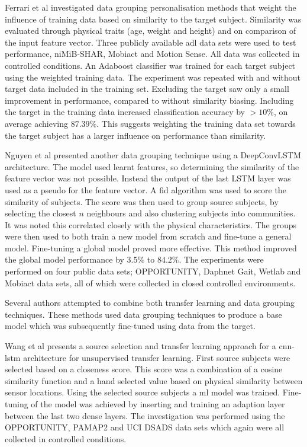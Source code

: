 Ferrari et al investigated data grouping personalisation methods that weight the influence of training data based on similarity to the target subject. Similarity was evaluated through physical traits (age, weight and height) and on comparison of the input feature vector. Three publicly available \acrshort{adl} data sets were used to test performance, niMiB-SHAR\cite{Micucci2017}, Mobiact\cite{Vavoulas2016} and Motion Sense\cite{Katevas2014}. All data was collected in controlled conditions. An Adaboost classifier was trained for each target subject using the weighted training data. The experiment was repeated with and without target data included in the training set. Excluding the target saw only a small improvement in performance, compared to without similarity biasing. Including the target in the training data increased classification accuracy by $>10\%$, on average achieving $87.39\%$. This suggests weighting the training data set towards the target subject has a larger influence on performance than similarity.

Nguyen et al presented another data grouping technique using a DeepConvLSTM architecture. The model used learnt features, so determining the similarity of the feature vector was not possible. Instead the output of the last LSTM layer was used as a pseudo for the feature vector. A \acrfull{fid} algorithm was used to score the similarity of subjects. The score was then used to group source subjects, by selecting the closest $n$ neighbours and also clustering subjects into communities. It was noted this correlated closely with the physical characteristics. The groups were then used to both train a new model from scratch and fine-tune a general model. Fine-tuning a global model proved more effective. This method improved the global model performance by $3.5\%$ to $84.2\%$. The experiments were performed on four public data sets; OPPORTUNITY\cite{Roggen2009}, Daphnet Gait\cite{Sigcha2020}, Wetlab\cite{Scholl2015} and Mobiact\cite{Vavoulas2016} data sets, all of which were collected in closed controlled environments.\cite{Nguyen2021}


Several authors attempted to combine both transfer learning and data grouping techniques. These methods used data grouping techniques to produce a base model which was subsequently fine-tuned using data from the target.

Wang et al presents a source selection and transfer learning approach for a \acrshort{cnn}-\acrshort{lstm} architecture for unsupervised transfer learning. First source subjects were selected based on a closeness score. This score was a combination of a cosine similarity function and a hand selected value based on physical similarity between sensor locations. Using the selected source subjects a \acrshort{ml} model was trained. Fine-tuning of the model was achieved by inserting and training an adaption layer between the last two dense layers. The investigation was performed using the OPPORTUNITY\cite{Roggen2009}, PAMAP2\cite{Reiss2012} and UCI DSADS\cite{Altun2010} data sets which again were all collected in controlled conditions.\cite{Wang2018a}

